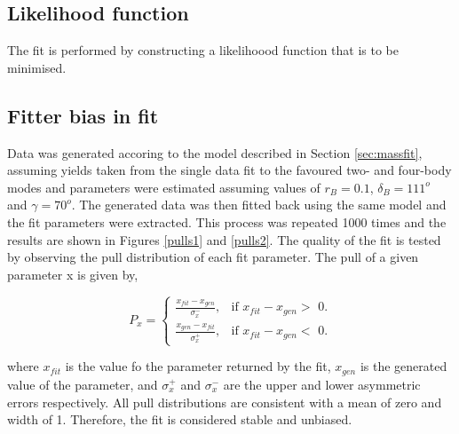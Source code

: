 \subsection{Likelihood function}
\label{sec:cpfit:likelihood}

The fit is performed by constructing a likelihoood function that is to be minimised.

\subsection{Fitter bias in \CP fit}
\label{sec:cpfit:fitterbias}

Data was generated accoring to the model described in Section \ref{sec:massfit}, assuming yields taken from the single data fit to the favoured two- and four-body modes and \CP parameters were estimated assuming values of $r_B = 0.1$, $\delta_B = 111^o$ and $\gamma = 70^o$. The generated data was then fitted back using the same model and the fit parameters were extracted. This process was repeated 1000 times and the results are shown in Figures \ref{pulls1} and \ref{pulls2}. The quality of the fit is tested by observing the pull distribution of each fit parameter. The pull of a given parameter x is given by,

\begin{equation*}
P_x = \begin{cases}
	\frac{x_{fit} - x_{gen}}{\sigma_x^-}, & \text{if $x_{fit} - x_{gen} >$ 0}. \\
	\frac{x_{gen} - x_{fit}}{\sigma_x^+}, & \text{if $x_{fit} - x_{gen} <$ 0}.
	\end{cases}
\end{equation*}

where $x_{fit}$ is the value fo the parameter returned by the fit, $x_{gen}$ is the generated value of the parameter, and $\sigma_x^+$ and $\sigma_x^-$ are the upper and lower asymmetric errors respectively. All pull distributions are consistent with a mean of zero and width of 1. Therefore, the fit is considered stable and unbiased.
 

